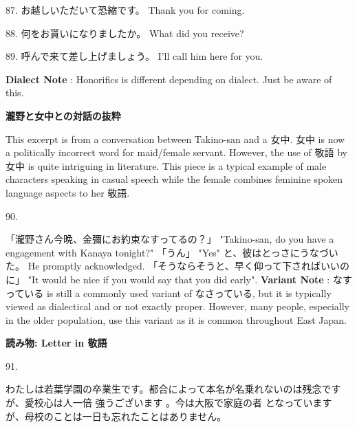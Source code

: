 \par{87. お越しいただいて恐縮です。 \hfill\break
Thank you for coming. }

\par{88. 何をお貰いになりましたか。 \hfill\break
What did you receive? }
 
\par{89. 呼んで来て差し上げましょう。 \hfill\break
I'll call him here for you.  }
 
\par{\textbf{Dialect Note }: Honorifics is different depending on dialect. Just be aware of this.  }

\begin{center}
\textbf{瀧野と女中との対話の抜粋 }
\end{center}

\par{ This excerpt is from a conversation between Takino-san and a 女中. 女中 is now a politically incorrect word for maid\slash female servant. However, the use of 敬語 by 女中 is quite intriguing in literature. This piece is a typical example of male characters speaking in casual speech while the female combines feminine spoken language aspects to her 敬語. }

\par{90. }

\par{「瀧野さん今晩、金彌にお約束なすってるの？」 \hfill\break
"Takino-san, do you have a engagement with Kanaya tonight?" \hfill\break
「うん」 \hfill\break
"Yes" \hfill\break
と、彼はとっさにうなづいた。 \hfill\break
He promptly acknowledged. \hfill\break
「そうならそうと、早く仰って下さればいいのに」 \hfill\break
"It would be nice if you would say that you did early". \hfill\break
\hfill\break
\textbf{Variant Note }: なすっている is still a commonly used variant of なさっている, but it is typically viewed as dialectical and or not exactly proper. However, many people, especially in the older population, use this variant as it is common throughout East Japan. }

\begin{center}
 \textbf{読み物: Letter in 敬語 }
\end{center}
 
\par{91. }

\par{わたしは若葉学園の卒業生です。都合によって本名が名乗れないのは残念ですが、愛校心は人一倍 強うございます 。今は大阪で家庭の者 となっています が、母校のことは一日も忘れたことはありません。 }

